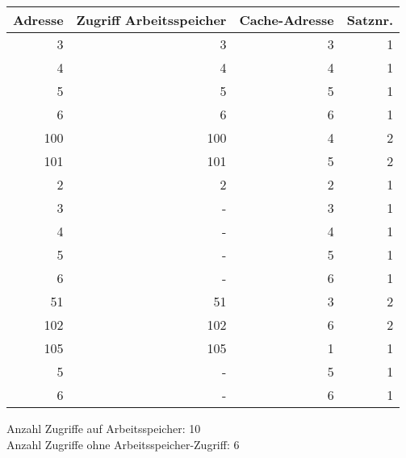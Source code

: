 \documentclass[10pt]{article}
\begin{document}
\begin{enumerate}[label=\alph*)]
		\begin{tabular}{r | r | r | r}
		Adresse & Zugriff Arbeitsspeicher & Cache-Adresse & Satznr.\\
		\hline
		3	& 	3 	& 3 	& 1\\
		4	&	4 	& 4 	& 1\\
		5	&	5 	& 5 	& 1\\
		6	&	6 	& 6 	& 1\\
		100	&	100 & 4 	& 2\\
		101	&	101	& 5 	& 2\\
		2	&	2	& 2 	& 1\\
		3	&	-	& 3 	& 1\\
		4	&	-	& 4 	& 1\\ %
		5	&	-	& 5 	& 1\\
		6	&	-	& 6 	& 1\\
		51	&	51	& 3 	& 2\\
		102 &	102 & 6 	& 2\\
		105 &	105 & 1		& 1\\  %
		5	&	-	& 5 	& 1\\
		6	&	-	& 6 	& 1\\
		\end{tabular}
		Anzahl Zugriffe auf Arbeitsspeicher: 10 \\
		Anzahl Zugriffe ohne Arbeitsspeicher-Zugriff: 6
\end{enumerate}

\newpage
\end{document}
